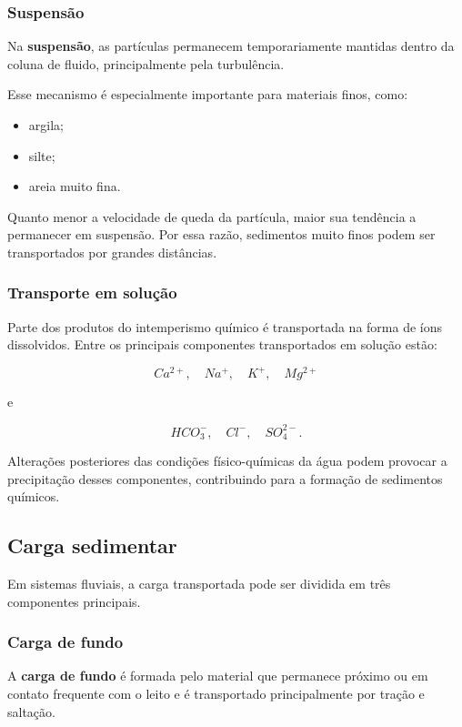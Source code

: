 \subsubsection{Suspensão}

Na \textbf{suspensão}, as partículas permanecem temporariamente mantidas dentro
da coluna de fluido, principalmente pela turbulência.

Esse mecanismo é especialmente importante para materiais finos, como:

\begin{itemize}
    \item argila;
    \item silte;
    \item areia muito fina.
\end{itemize}

Quanto menor a velocidade de queda da partícula, maior sua tendência a
permanecer em suspensão. Por essa razão, sedimentos muito finos podem ser
transportados por grandes distâncias.

\subsubsection{Transporte em solução}

Parte dos produtos do intemperismo químico é transportada na forma de íons
dissolvidos. Entre os principais componentes transportados em solução estão:

\[
Ca^{2+}, \quad Na^+, \quad K^+, \quad Mg^{2+}
\]

e

\[
HCO_3^-, \quad Cl^-, \quad SO_4^{2-}.
\]

Alterações posteriores das condições físico-químicas da água podem provocar a
precipitação desses componentes, contribuindo para a formação de sedimentos
químicos.

\subsection{Carga sedimentar}

Em sistemas fluviais, a carga transportada pode ser dividida em três componentes
principais.

\subsubsection{Carga de fundo}

A \textbf{carga de fundo} é formada pelo material que permanece próximo ou em
contato frequente com o leito e é transportado principalmente por tração e
saltação.

